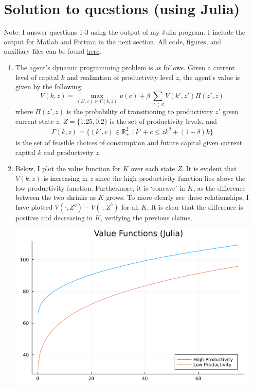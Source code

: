 \documentclass[12pt]{article}
\begin{document}
\section{Solution to questions (using Julia)}
Note: I answer questions 1-3 using the output of my Julia program. I include the output for Matlab and Fortran in the next section. All code, figures, and auxiliary files can be found \href{https://github.com/johnfhiggins/F22/tree/master/Computational/PS1}{here}. 
\begin{enumerate}
	\item The agent's dynamic programming problem is as follows. Given a current level of capital $k$ and realization of productivity level $z$, the agent's value is given by the following:
	\[V(k, z) = \max_{(k', c) \in \Gamma(k,z)} u(c) + \beta \sum_{z' \in Z} V(k', z') \Pi(z', z)\]
	where $\Pi(z',z)$ is the probability of transitioning to productivity $z'$ given current state $z$, $Z = \{1.25, 0.2\}$ is the set of productivity levels, and
	\begin{align*}\Gamma(k,z) = \{(k', c) \in \mathbb{R}^2_+ \mid k' + c \leq z k^{\theta} + (1-\delta) k\}
	\end{align*}
	is the set of feasible choices of consumption and future capital given current capital $k$ and productivity $z$.
    \item Below, I plot the value function for $K$ over each state $Z$. It is evident that $V(k, z)$ is increasing in $z$ since the high productivity function lies above the low productivity function. Furthermore, it is `concave' in $K$, as the difference between the two shrinks as $K$ grows. To more clearly see these relationships, I have plotted $V(\cdot, Z^g) - V(\cdot, Z^b)$ for all $K$. It is clear that the difference is positive and decreasing in $K$, verifying the previous claims.
    \begin{center}
        \includegraphics[scale=0.4]{vfplot.png}\\

\end{center}
\end{enumerate}
\end{document}
